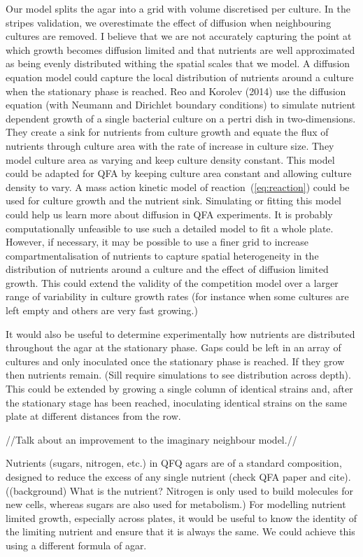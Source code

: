Our model splits the agar into a grid with volume discretised per
culture. In the stripes validation, we overestimate the effect of
diffusion when neighbouring cultures are removed. I believe that we
are not accurately capturing the point at which growth becomes
diffusion limited and that nutrients are well approximated as being
evenly distributed withing the spatial scales that we model. A
diffusion equation model could capture the local distribution of
nutrients around a culture when the stationary phase is reached.  Reo
and Korolev (2014) use the diffusion equation (with Neumann and
Dirichlet boundary conditions) to simulate nutrient dependent growth
of a single bacterial culture on a pertri dish in two-dimensions. They
create a sink for nutrients from culture growth and equate the flux of
nutrients through culture area with the rate of increase in culture
size. They model culture area as varying and keep culture density
constant. This model could be adapted for QFA by keeping culture area
constant and allowing culture density to vary. A mass action kinetic
model of reaction~(\ref{eq:reaction}) could be used for culture growth
and the nutrient sink. Simulating or fitting this model could help us
learn more about diffusion in QFA experiments. It is probably
computationally unfeasible to use such a detailed model to fit a whole
plate. However, if necessary, it may be possible to use a finer grid
to increase compartmentalisation of nutrients to capture spatial
heterogeneity in the distribution of nutrients around a culture and
the effect of diffusion limited growth. This could extend the validity
of the competition model over a larger range of variability in culture
growth rates (for instance when some cultures are left empty and
others are very fast growing.)

It would also be useful to determine experimentally how nutrients are
distributed throughout the agar at the stationary phase. Gaps could be
left in an array of cultures and only inoculated once the stationary
phase is reached. If they grow then nutrients remain. (Sill require
simulations to see distribution across depth). This could be extended
by growing a single column of identical strains and, after the
stationary stage has been reached, inoculating identical strains on
the same plate at different distances from the row.

//Talk about an improvement to the imaginary neighbour model.//

Nutrients (sugars, nitrogen, etc.) in QFQ agars are of a standard
composition, designed to reduce the excess of any single nutrient
(check QFA paper and cite). ((background) What is the nutrient?
Nitrogen is only used to build molecules for new cells, whereas sugars
are also used for metabolism.) For modelling nutrient limited growth,
especially across plates, it would be useful to know the identity of
the limiting nutrient and ensure that it is always the same. We could
achieve this using a different formula of agar.

